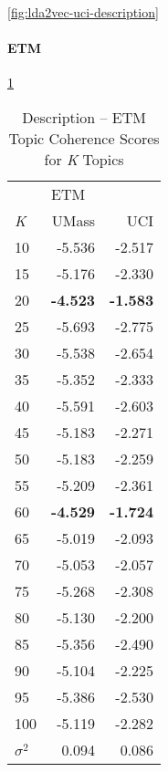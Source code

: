 \documentclass[letterpaper,12pt]{article}
\begin{document}
\ref{fig:lda2vec-uci-description}
\newpage
\paragraph{ETM}

\ref{tab:etm_description_tc}
\begin{table}
	\caption{\label{tab:etm_description_tc} Description -- ETM Topic Coherence Scores for \emph{K} Topics}
	\begin{center}
		\begin{tabular}{lrr}
			\toprule
			{} & \multicolumn{2}{l}{ETM} \\
			\emph{K} &  UMass &    UCI \\
			\midrule
			10  & -5.536 & -2.517 \\
			15  & -5.176 & -2.330 \\
			20  & \textbf{-4.523} & \textbf{-1.583} \\
			25  & -5.693 & -2.775 \\
			30  & -5.538 & -2.654 \\
			35  & -5.352 & -2.333 \\
			40  & -5.591 & -2.603 \\
			45  & -5.183 & -2.271 \\
			50  & -5.183 & -2.259 \\
			55  & -5.209 & -2.361 \\
			60  & \textbf{-4.529} & \textbf{-1.724} \\
			65  & -5.019 & -2.093 \\
			70  & -5.053 & -2.057 \\
			75  & -5.268 & -2.308 \\
			80  & -5.130 & -2.200 \\
			85  & -5.356 & -2.490 \\
			90  & -5.104 & -2.225 \\
			95  & -5.386 & -2.530 \\
			100 & -5.119 & -2.282 \\
			\midrule
			$\sigma^2$ & 0.094 & 0.086 \\
			\bottomrule
			\end{tabular}
	\end{center}
\end{table}
\end{document}
